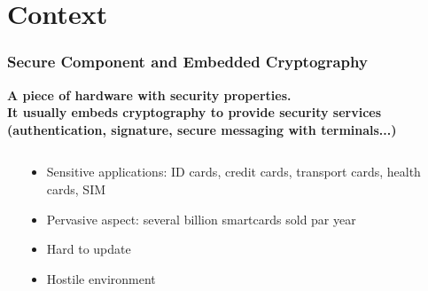 \section{Context}


\begin{frame}
\frametitle{Secure Component and Embedded Cryptography}
\textbf{A piece of hardware with security properties.}\\
\textbf{It usually embeds cryptography to provide security services (authentication, signature, secure messaging with terminals...)}
\begin{columns}
\begin{column}{0.5\textwidth}
\end{column}
\begin{column}{0.5\textwidth}
\begin{itemize}
\item Sensitive applications: ID cards, credit cards, transport cards, health cards, SIM
\item Pervasive aspect: several billion smartcards sold par year
\item Hard to update
\item Hostile environment
\end{itemize}
\end{column}
\end{columns}
\end{frame}

